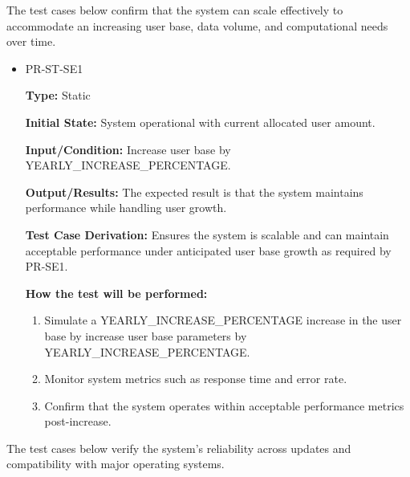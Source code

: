 \documentclass[12pt, titlepage]{article}
\begin{document}
\vspace{1em}
\hspace{2em}The test cases below confirm that the system can scale effectively to accommodate an increasing user base, data volume, and computational needs over time.

\begin{itemize}
  \item PR-ST-SE1
  \begin{mdframed}[linewidth=0.5mm]
      \textbf{Type:} Static \par
      \textbf{Initial State:} System operational with current allocated user amount. \par
      \textbf{Input/Condition:} Increase user base by YEARLY\_INCREASE\_PERCENTAGE. \par
      \textbf{Output/Results:} The expected result is that the system maintains performance while handling user growth. \par
      \textbf{Test Case Derivation:} Ensures the system is scalable and can maintain acceptable performance under anticipated user base growth as required by PR-SE1. \par
      \textbf{How the test will be performed:}
      \begin{enumerate}[noitemsep]
        \item Simulate a YEARLY\_INCREASE\_PERCENTAGE increase in the user base by increase user base parameters by YEARLY\_INCREASE\_PERCENTAGE.
        \item Monitor system metrics such as response time and error rate.
        \item Confirm that the system operates within acceptable performance metrics post-increase.
      \end{enumerate}
  \end{mdframed}
\end{itemize}

\vspace{1em}
\hspace{2em}The test cases below verify the system’s reliability across updates and compatibility with major operating systems.
\end{document}

